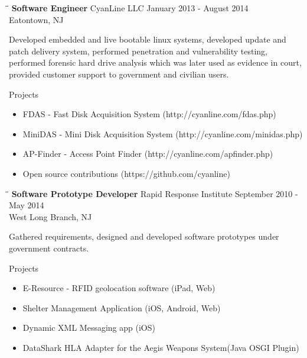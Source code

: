 \documentclass{res}
\begin{document}
\begin{resume}
   \begin{tabbing}
   \hspace{2.3in}\= \hspace{2.6in}\= \kill %
    {\bf Software Engineer} \>CyanLine LLC     \>January 2013 - August 2014\\
                             \>Eatontown, NJ
   \end{tabbing}\vspace{-20pt}      %
    Developed embedded and live bootable linux systems,
    developed update and patch delivery system,
    performed penetration and vulnerability testing,
    performed forensic hard drive analysis which was later used as evidence in court,
    provided customer support to government and civilian users.

    Projects
    \begin{itemize}
        \item FDAS - Fast Disk Acquisition System (http://cyanline.com/fdas.php)
        \item MiniDAS - Mini Disk Acquisition System (http://cyanline.com/minidas.php)
        \item AP-Finder - Access Point Finder (http://cyanline.com/apfinder.php)
        \item Open source contributions (https://github.com/cyanline)
    \end{itemize}

   \begin{tabbing}
   \hspace{2.3in}\= \hspace{2.6in}\= \kill %
    {\bf Software Prototype Developer} \>Rapid Response Institute     \>September 2010 - May 2014\\
                             \>West Long Branch, NJ
   \end{tabbing}\vspace{-20pt}      %
   Gathered requirements, designed and developed software prototypes under government contracts.

    Projects
    \begin{itemize}
        \item E-Resource - RFID geolocation software (iPad, Web)
        \item Shelter Management Application (iOS, Android, Web)
        \item Dynamic XML Messaging app (iOS)
        \item DataShark HLA Adapter for the Aegis Weapons System(Java OSGI Plugin)
    \end{itemize}


\end{resume}
\end{document}

